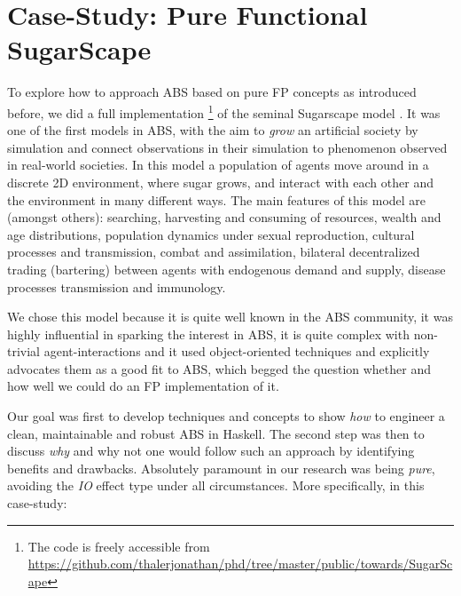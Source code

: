 \section{Case-Study: Pure Functional SugarScape}
\label{sec:case_study}

To explore how to approach ABS based on pure FP concepts as introduced before, we did a full implementation \footnote{The code is freely accessible from \url{https://github.com/thalerjonathan/phd/tree/master/public/towards/SugarScape}} of the seminal Sugarscape model \cite{epstein_growing_1996}. It was one of the first models in ABS, with the aim to \textit{grow} an artificial society by simulation and connect observations in their simulation to phenomenon observed in real-world societies. In this model a population of agents move around in a discrete 2D environment, where sugar grows, and interact with each other and the environment in many different ways. The main features of this model are (amongst others): searching, harvesting and consuming of resources, wealth and age distributions, population dynamics under sexual reproduction, cultural processes and transmission, combat and assimilation, bilateral decentralized trading (bartering) between agents with endogenous demand and supply, disease processes transmission and immunology.

We chose this model because it is quite well known in the ABS community, it was highly influential in sparking the interest in ABS, it is quite complex with non-trivial agent-interactions and it used object-oriented techniques and explicitly advocates them as a good fit to ABS, which begged the question whether and how well we could do an FP implementation of it.

Our goal was first to develop techniques and concepts to show \textit{how} to engineer a clean, maintainable and robust ABS in Haskell. The second step was then to discuss \textit{why} and why not one would follow such an approach by identifying benefits and drawbacks. Absolutely paramount in our research was being \textit{pure}, avoiding the \textit{IO} effect type under all circumstances. More specifically, in this case-study:

